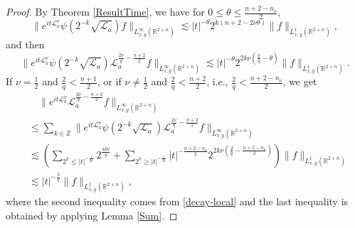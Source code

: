 \documentclass[a4paper,11pt, reqno]{amsart}
\numberwithin{equation}{section}
\theoremstyle{plain}
\theoremstyle{definition}
\theoremstyle{remark}
\begin{document}
\begin{proof}
By Theorem \ref{ResultTime}, we have for $0\leq \theta\leq \frac{n+2-n_\nu}{2}$,
\begin{equation*}
\|e^{it\mathcal{L}_a^\nu} \psi(2^{-k}\sqrt{\mathcal{L}_a})f\|_{L_{x,y}^\infty(\mathbb{R}^{2+n})}\lesssim |t|^{-\theta}2^{k(n+2-2\nu\theta)}\|f\|_{L_{x,y}^1(\mathbb{R}^{2+n})},
\end{equation*}
and then
\begin{equation}\label{decay-local}
\|e^{it\mathcal{L}_a^\nu} \psi(2^{-k}\sqrt{\mathcal{L}_a})\mathcal{L}_a^{\frac{2\nu}{q}-\frac{n+2}{2}}f\|_{L_{x,y}^\infty(\mathbb{R}^{2+n})}\lesssim |t|^{-\theta}2^{2k\nu(\frac{2}{q}-\theta)}\|f\|_{L_{x,y}^1(\mathbb{R}^{2+n})}.
\end{equation}
If $\nu=\frac{1}{2}$ and $\frac{2}{q}<\frac{n+1}{2}$, or if $\nu\not=\frac{1}{2}$ and $\frac{2}{q}<\frac{n+2}{2}$, i.e., $\frac{2}{q}<\frac{n+2-n_\nu}{2}$, we get
\begin{align*}
&\quad \|e^{it\mathcal{L}_a^\nu} \mathcal{L}_a^{\frac{2\nu}{q}-\frac{n+2}{2}}f\|_{L_{x,y}^\infty(\mathbb{R}^{2+n})}\\
&\leq \sum_{k\in\mathbb{Z}} \|e^{it\mathcal{L}_a^\nu} \psi(2^{-k}\sqrt{\mathcal{L}_a})\mathcal{L}_a^{\frac{2\nu}{q}-\frac{n+2}{2}}f\|_{L_{x,y}^\infty(\mathbb{R}^{2+n})}\\
&\lesssim \left(\sum_{2^k\leq |t|^{-\frac{1}{2\nu}}}2^{\frac{4k\nu}{q}}+\sum_{2^k\geq|t|^{-\frac{1}{2\nu}}}|t|^{-\frac{n+2-n_\nu}{2}}2^{2k\nu(\frac{2}{q}-\frac{n+2-n_\nu}{2})}\right)\|f\|_{L_{x,y}^1(\mathbb{R}^{2+n})}\\
&\lesssim |t|^{-\frac{2}{q}}\|f\|_{L_{x,y}^1(\mathbb{R}^{2+n})},
\end{align*}
where the second inequality comes from \eqref{decay-local} and the last inequality is obtained by applying Lemma \ref{Sum}. 


\end{proof}
\end{document}
